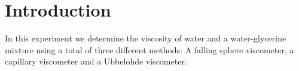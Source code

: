 \section{Introduction}

In this experiment we determine the viscosity of water and a water-glycerine mixture using a total of three different methods: A falling sphere viscometer, a capillary viscometer and a Ubbelohde viscometer.


